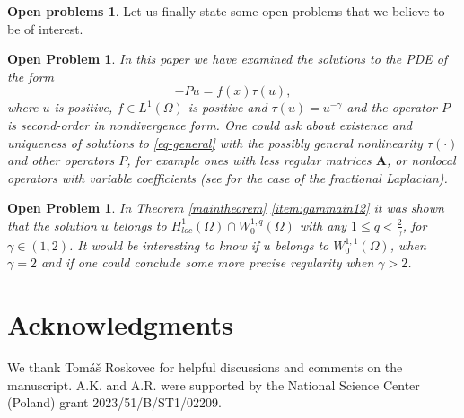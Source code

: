 \documentclass[12pt,a4paper]{amsart}
\newtheorem{o-problem}[theorem]{\bf Open Problem}
\theoremstyle{definition}
\newtheorem*{oq}{\bf Open problems}
\newcommand{\A}{\mathbf{A}}
\begin{document}
\begin{oq}

Let us finally state some open problems that we believe to be of interest.

\label{general}\rm
\begin{o-problem}\rm
In this paper we have examined the solutions to the PDE of the form
\begin{equation}\label{eq-general}
 -Pu = f(x)\tau (u),
\end{equation}
 where $u$ is positive, $f\in L^1(\Omega)$ is positive and 
$\tau (u)= u^{-\gamma}$ and the operator $P$ is second-order in nondivergence form.
One could ask about existence and uniqueness of solutions to \eqref{eq-general} with the possibly general nonlinearity 
$\tau (\cdot)$ and other operators $P$, for example ones with less regular matrices $\A$, or nonlocal operators with variable coefficients (see \cite{MR3356049} for the case of the fractional Laplacian).
\end{o-problem}

\begin{o-problem}\rm
    In Theorem \ref{maintheorem} \ref{item:gammain12} it was shown that the solution $u$ belongs to $H^1_{loc}(\Omega) \cap W_{0}^{1,q}(\Omega)$ with any $1\le q < \frac{2}{\gamma}$, for $\gamma \in (1,2)$. It would be interesting to know if $u$ belongs to $W_{0}^{1,1}(\Omega)$, when $\gamma =2$ and if one could conclude some more precise regularity when $\gamma >2$. 
\end{o-problem}
\end{oq}

\section*{Acknowledgments}
We thank Tom\'a\v{s} Roskovec for helpful discussions and comments on the manuscript. A.K. and A.R. were supported by the National Science Center (Poland) grant 2023/51/B/ST1/02209. 







\end{document}
